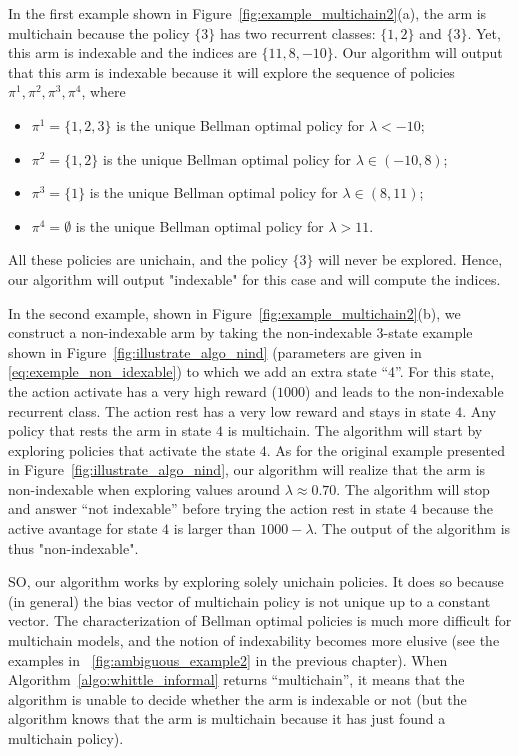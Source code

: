 In the first example shown in Figure~\ref{fig:example_multichain2}(a), the arm is multichain because the policy $\{3\}$ has two recurrent classes: $\{1,2\}$ and $\{3\}$. Yet, this arm is indexable and the indices are $\{11,8,-10\}$. Our algorithm will output that this arm is indexable because it will explore the sequence of policies $\pi^1,\pi^2,\pi^3,\pi^4$, where
\begin{itemize}
    \item $\pi^1=\{1,2,3\}$ is the unique Bellman optimal policy for $\lambda<-10$;
    \item $\pi^2=\{1,2\}$ is the unique Bellman optimal policy for $\lambda\in(-10,8)$;
    \item $\pi^3=\{1\}$ is the unique Bellman optimal policy for $\lambda\in(8,11)$;
    \item $\pi^4=\emptyset$ is the unique Bellman optimal policy for $\lambda>11$. 
\end{itemize}
All  these policies are unichain, and the policy $\{3\}$ will never be explored.  Hence, our algorithm will output "indexable" for this case and will compute the indices.

In the second example, shown in Figure~\ref{fig:example_multichain2}(b), we construct a non-indexable arm by taking the non-indexable $3$-state example shown in Figure~\ref{fig:illustrate_algo_nind} (parameters are given in \eqref{eq:exemple_non_idexable}) to which we add an extra state ``4''. For this state, the action activate has a very high reward ($1000$) and leads to the non-indexable recurrent class. The action rest has a very low reward and stays in state $4$. Any policy that rests the arm in state $4$ is multichain. The algorithm will start by exploring policies that activate the state $4$. As for the original example presented in Figure~\ref{fig:illustrate_algo_nind}, our algorithm will realize that the arm is non-indexable when exploring values around $\lambda\approx0.70$. The algorithm will stop and answer ``not indexable'' before  trying  the action rest in state $4$  because the active avantage for state $4$ is larger than $1000-\lambda$. The output of the algorithm is thus "non-indexable".

SO, our algorithm works by exploring solely unichain policies. It does so because (in general) the bias vector of multichain policy is not unique up to a constant vector.
The characterization of Bellman optimal policies is much more difficult for multichain models, and the notion of indexability becomes more elusive (see the examples in \figurename~\ref{fig:ambiguous_example2} in the previous chapter).
When Algorithm~\ref{algo:whittle_informal} returns ``multichain'', it means that the algorithm is unable to decide whether the arm is indexable or not (but the algorithm knows that the arm is multichain because it has just found a multichain policy).

